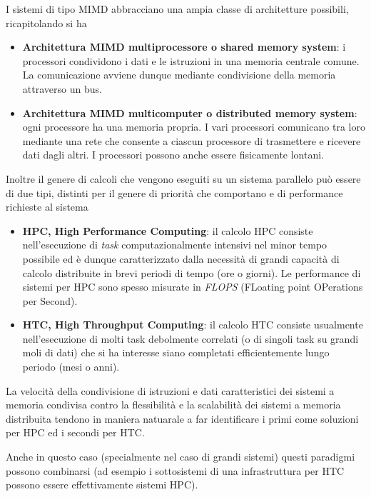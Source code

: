 I sistemi di tipo MIMD abbracciano una ampia classe di architetture
possibili, ricapitolando si ha

\begin{itemize}
\tightlist
\item
  \textbf{Architettura MIMD multiprocessore o shared memory system}: i
  processori condividono i dati e le istruzioni in una memoria centrale
  comune. La comunicazione avviene dunque mediante condivisione della
  memoria attraverso un bus.
\item
  \textbf{Architettura MIMD multicomputer o distributed memory system}:
  ogni processore ha una memoria propria. I vari processori comunicano
  tra loro mediante una rete che consente a ciascun processore di
  trasmettere e ricevere dati dagli altri. I processori possono anche
  essere fisicamente lontani.
\end{itemize}

Inoltre il genere di calcoli che vengono eseguiti su un sistema
parallelo può essere di due tipi, distinti per il genere di priorità che
comportano e di performance richieste al sistema

\begin{itemize}
\tightlist
\item
  \textbf{HPC, High Performance Computing}: il calcolo HPC consiste
  nell'esecuzione di \emph{task} computazionalmente intensivi nel minor
  tempo possibile ed è dunque caratterizzato dalla necessità di grandi
  capacità di calcolo distribuite in brevi periodi di tempo (ore o
  giorni). Le performance di sistemi per HPC sono spesso misurate in
  \emph{FLOPS} (FLoating point OPerations per Second).
\item
  \textbf{HTC, High Throughput Computing}: il calcolo HTC consiste
  usualmente nell'esecuzione di molti task debolmente correlati (o di
  singoli task su grandi moli di dati) che si ha interesse siano
  completati efficientemente lungo periodo (mesi o anni).
\end{itemize}

La velocità della condivisione di istruzioni e dati caratteristici dei
sistemi a memoria condivisa contro la flessibilità e la scalabilità dei
sistemi a memoria distribuita tendono in maniera natuarale a far
identificare i primi come soluzioni per HPC ed i secondi per HTC.

Anche in questo caso (specialmente nel caso di grandi sistemi) questi
paradigmi possono combinarsi (ad esempio i sottosistemi di una
infrastruttura per HTC possono essere effettivamente sistemi HPC).

